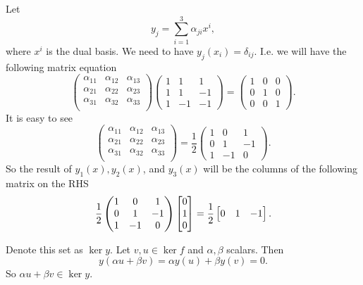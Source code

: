\begin{problem}
	\begin{solution}
		Let 
		\[ y_j = \sum_{i=1}^{3} \alpha_{ji} x^i, \]
		where $ x^i $ is the dual basis. We need to have $ y_j(x_i) = \delta_{ij} $. I.e. we will have the following matrix equation
		\[ 
		\begin{pmatrix}
			\alpha_{11} & \alpha_{12} & \alpha_{13} \\
			\alpha_{21} & \alpha_{22} & \alpha_{23} \\
			\alpha_{31} & \alpha_{32} & \alpha_{33} \\
		\end{pmatrix}
		\begin{pmatrix}
			1 & 1 & 1 \\
			1 & 1 & -1 \\
			1 & -1 & -1 
		\end{pmatrix}
		= 
		\begin{pmatrix}
			1 & 0 & 0 \\
			0 & 1 & 0 \\
			0 & 0 & 1 
		\end{pmatrix}.
		 \]
		 It is easy to see
		 \[ 
		 \begin{pmatrix}
		 	\alpha_{11} & \alpha_{12} & \alpha_{13} \\
		 	\alpha_{21} & \alpha_{22} & \alpha_{23} \\
		 	\alpha_{31} & \alpha_{32} & \alpha_{33} \\
		 \end{pmatrix}
		 = 
		 \frac{1}{2}\begin{pmatrix}
		 	1 & 0 & 1 \\
		 	0 & 1 & -1 \\
		 	1 & -1 & 0
		 \end{pmatrix}.
		  \]
		  So the result of $ y_1(x),y_2(x) $, and $ y_3(x) $ will be the columns of the following matrix on the RHS
		  \[ 
		  \frac{1}{2}\begin{pmatrix}
		  	1 & 0 & 1 \\
		  	0 & 1 & -1 \\
		  	1 & -1 & 0
		  \end{pmatrix}
		  \begin{bmatrix} 0 \\ 1 \\ 0 \end{bmatrix}
		   = 
		   \frac{1}{2}
		   \begin{bmatrix}
		   	0 & 1 & -1
		   \end{bmatrix}.
		   \]
	\end{solution}
\end{problem}


\begin{problem}
	\begin{solution}
		Denote this set as $ \ker y $. Let $ v,u \in \ker f $ and $ \alpha,\beta $ scalars. Then
		\[ y(\alpha u + \beta v) = \alpha y(u) + \beta y(v) = 0. \]
		So $ \alpha u + \beta v \in \ker y $.
	\end{solution}
\end{problem}



